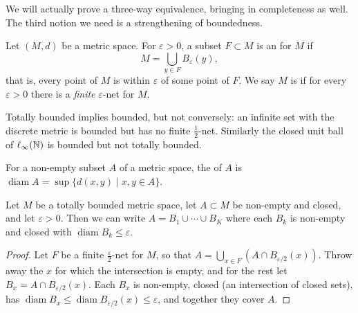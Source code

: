 \documentclass[a4paper]{scrartcl}
\newcommand{\diam}{\operatorname{diam}}
\begin{document}
We will actually prove a three-way equivalence, bringing in completeness as well. The third notion we need is a strengthening of boundedness.

\begin{definition}
    Let $(M, d)$ be a metric space. For $\varepsilon > 0$, a subset $F \subset M$ is an  for $M$ if
    $$
    M = \bigcup_{y \in F} B_{\varepsilon}(y),
    $$
    that is, every point of $M$ is within $\varepsilon$ of some point of $F$. We say $M$ is  if for every $\varepsilon > 0$ there is a \emph{finite} $\varepsilon$-net for $M$.
\end{definition}

Totally bounded implies bounded, but not conversely: an infinite set with the discrete metric is bounded but has no finite $\frac{1}{2}$-net. Similarly the closed unit ball of $\ell_\infty(\mathbb{N})$ is bounded but not totally bounded.

\begin{definition}[Diameter]
    For a non-empty subset $A$ of a metric space, the  of $A$ is $\diam A = \sup\{d(x, y) \mid x, y \in A\}$.
\end{definition}

\begin{lemma}\label{lemma:chop}
    Let $M$ be a totally bounded metric space, let $A \subset M$ be non-empty and closed, and let $\varepsilon > 0$. Then we can write $A = B_1 \cup \cdots \cup B_K$ where each $B_k$ is non-empty and closed with $\diam B_k \leq \varepsilon$.
\end{lemma}
\begin{proof}
    Let $F$ be a finite $\frac{\varepsilon}{2}$-net for $M$, so that $A = \bigcup_{x \in F} (A \cap B_{\varepsilon/2}(x))$. Throw away the $x$ for which the intersection is empty, and for the rest let $B_x = A \cap B_{\varepsilon/2}(x)$. Each $B_x$ is non-empty, closed (an intersection of closed sets), has $\diam B_x \leq \diam B_{\varepsilon/2}(x) \leq \varepsilon$, and together they cover $A$.
\end{proof}
\end{document}
